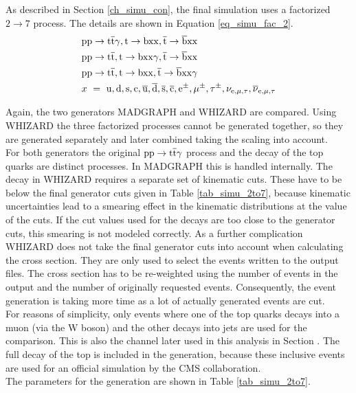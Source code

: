 As described in Section \ref{ch_simu_con}, the final simulation uses a factorized $2 \to 7$ process. The details are shown in Equation \ref{eq_simu_fac_2}.\\

\begin{equation}
\begin{split}
& \mathrm{pp}\to \mathrm{t}\overline{\mathrm{t}} \gamma,  \mathrm{t} \to \mathrm{bxx},  \overline{\mathrm{t}} \to \overline{\mathrm{b}} \mathrm{xx} \\
& \mathrm{pp}\to \mathrm{t} \overline{\mathrm{t}},  \mathrm{t} \to \mathrm{bxx} \gamma,  \overline{\mathrm{t}} \to \overline{\mathrm{b}} \mathrm{xx} \\
& \mathrm{pp}\to \mathrm{t} \overline{\mathrm{t}},  \mathrm{t} \to \mathrm{bxx},  \overline{\mathrm{t}} \to \overline{\mathrm{b}} \mathrm{xx} \gamma \\
&  x\ = \ \mathrm{u}, \mathrm{d}, \mathrm{s}, \mathrm{c}, \overline{\mathrm{u}}, \overline{\mathrm{d}},  \overline{\mathrm{s}},  \overline{\mathrm{c}}, \mathrm{e}^{\pm}, \mu^{\pm}, \tau^{\pm}, \nu_{\mathrm{e},\mu,\tau}, \overline{\nu}_{\mathrm{e},\mu,\tau} 
\end{split}
\label{eq_simu_fac_2}
\end{equation}

Again, the two generators MADGRAPH and WHIZARD are compared. Using WHIZARD the three factorized processes cannot be generated together, so they are generated separately and later combined taking the scaling into account.\\
For both generators the original $ \mathrm{pp} \to \mathrm{t}\overline{\mathrm{t}} \gamma$ process and the decay of the top quarks are distinct processes. In MADGRAPH this is handled internally. The decay in WHIZARD requires a separate set of kinematic cuts. These have to be below the final generator cuts given in Table \ref{tab_simu_2to7}, because kinematic uncertainties lead to a smearing effect in the kinematic distributions at the value of the cuts. If the cut values used for the decays are too close to the generator cuts, this smearing is not modeled correctly. As a further complication WHIZARD does not take the final generator cuts into account when calculating the cross section. They are only used to select the events written to the output files. The cross section has to be re-weighted using the number of events in the output and the number of originally requested events. Consequently, the event generation is taking more time as a lot of actually generated events are cut. \\
For reasons of simplicity, only events where one of the top quarks decays into a muon (via the W boson) and the other decays into jets are used for the comparison. This is also the channel later used in this analysis in Section . The full decay of the top is included in the generation, because these inclusive \ttgamma events are used for an official simulation by the CMS collaboration.\\
The parameters for the generation are shown in Table \ref{tab_simu_2to7}.

